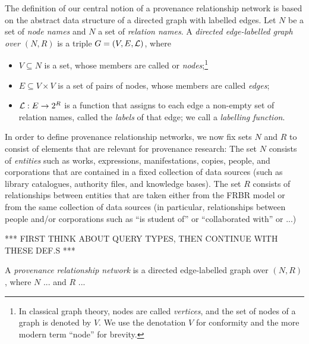 The definition of our central notion of a provenance relationship network
is based on the abstract data structure of a directed graph with labelled edges.
Let $N$ be a set of \emph{node names} and $N$ a set of \emph{relation names}.
A \emph{directed edge-labelled graph over $(N,R)$} is a triple $G = (V,E,\mathcal{L})$,
where
%
\begin{itemize}
  \item
  $V \subseteq N$ is a set, whose members are called or \emph{nodes};\footnote{%
    In classical graph theory, nodes are called \emph{vertices}, and the set of
    nodes of a graph is denoted by $V$. We use the denotation $V$ for conformity
    and the more modern term ``node'' for brevity.%
  }      
  \item 
  $E \subseteq V \times V$ is a set of pairs of nodes, whose members are called \emph{edges};
  \item
  $\mathcal{L} : E \to 2^R$ is a function that assigns to each edge a non-empty set of relation names,
  called the \emph{labels} of that edge; we call \Lmc a \emph{labelling function}.
\end{itemize}
%

In order to define provenance relationship networks, we now fix sets $N$ and $R$ to consist
of elements that are relevant for provenance research:
The set $N$ consists of \emph{entities} such as 
works, expressions, manifestations, copies, people, and corporations
that are contained in a fixed collection of data sources (such as library catalogues,
authority files, and knowledge bases). The set $R$ consists of relationships
between entities that are taken either from the FRBR model
or from the same collection of data sources (in particular, relationships between people and/or corporations
such as ``is student of'' or ``collaborated with'' or ...)

*** FIRST THINK ABOUT QUERY TYPES, THEN CONTINUE WITH THESE DEF.S ***


A \emph{provenance relationship network} is a directed edge-labelled graph over $(N,R)$,
where $N$ ... and $R$ ... 
